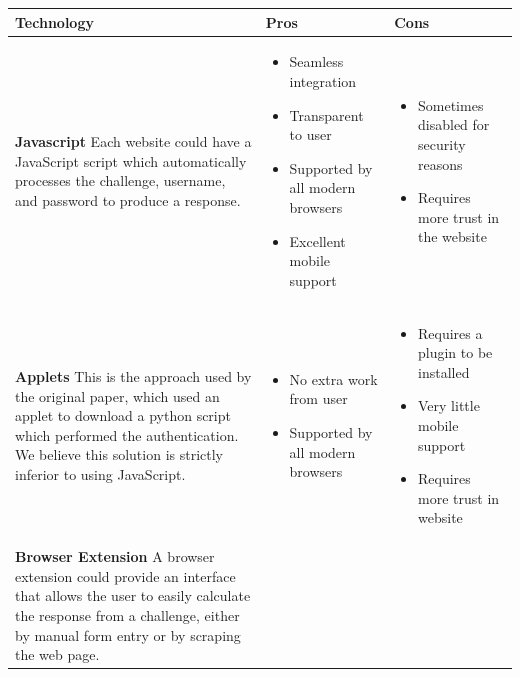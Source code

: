 \documentclass[11pt]{article}
\begin{document}
\small
\begin{center}
    \begin{tabular}{|  p{6cm} | p{5cm} | p{5cm} |}
    \hline
    Technology & Pros & Cons \\ \hline
    \vspace{.4cm}
    \textbf{Javascript}
    Each website could have a JavaScript script which automatically processes the challenge, username, and password to produce a response. & 

    \begin{itemize}[leftmargin=*]
    \item Seamless integration

    \item Transparent to user

    \item Supported by all modern browsers

    \item Excellent mobile support
    \end{itemize}
    &
    \begin{itemize}[leftmargin=*]
    \item Sometimes disabled for security reasons

    \item Requires more trust in the website
    \end{itemize}
    \\ \hline
    \vspace{.4cm}
    \textbf{Applets}
    This is the approach used by the original paper, which used an applet to download a python script which performed the authentication. We believe this solution is strictly inferior to using JavaScript.
    &
    \begin{itemize}[leftmargin=*]
    \item No extra work from user

    \item  Supported by all modern browsers
    \end{itemize}
    &
    \begin{itemize}[leftmargin=*]
    \item Requires a plugin to be installed

    \item Very little mobile support

    \item Requires more trust in website
    \end{itemize}

    \\ \hline
    \vspace{.4cm}
    \textbf{Browser Extension}
    A browser extension could provide an interface that allows the user to easily calculate the response from a challenge, either by manual form entry or by scraping the web page.


\end{tabular}
\end{center}
\end{document}
